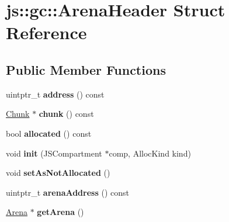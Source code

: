 \hypertarget{structjs_1_1gc_1_1_arena_header}{\section{js\-:\-:gc\-:\-:Arena\-Header Struct Reference}
\label{structjs_1_1gc_1_1_arena_header}
}
\subsection*{Public Member Functions}
\begin{DoxyCompactItemize}
\item 
\hypertarget{structjs_1_1gc_1_1_arena_header_aa2f3ff8445f19ee01d17b03a42a2305a}{uintptr\-\_\-t {\bfseries address} () const }\label{structjs_1_1gc_1_1_arena_header_aa2f3ff8445f19ee01d17b03a42a2305a}

\item 
\hypertarget{structjs_1_1gc_1_1_arena_header_aa18aba696f6fc8a63ea9b75e77dc13fb}{\hyperlink{structjs_1_1gc_1_1_chunk}{Chunk} $\ast$ {\bfseries chunk} () const }\label{structjs_1_1gc_1_1_arena_header_aa18aba696f6fc8a63ea9b75e77dc13fb}

\item 
\hypertarget{structjs_1_1gc_1_1_arena_header_a6a1486aa87c78ebd2fbfcf863c9320c7}{bool {\bfseries allocated} () const }\label{structjs_1_1gc_1_1_arena_header_a6a1486aa87c78ebd2fbfcf863c9320c7}

\item 
\hypertarget{structjs_1_1gc_1_1_arena_header_ab813e5b60976fe7200528ee9ecead2b7}{void {\bfseries init} (J\-S\-Compartment $\ast$comp, Alloc\-Kind kind)}\label{structjs_1_1gc_1_1_arena_header_ab813e5b60976fe7200528ee9ecead2b7}

\item 
\hypertarget{structjs_1_1gc_1_1_arena_header_a250546ae521fdaf268d62486979a45ad}{void {\bfseries set\-As\-Not\-Allocated} ()}\label{structjs_1_1gc_1_1_arena_header_a250546ae521fdaf268d62486979a45ad}

\item 
\hypertarget{structjs_1_1gc_1_1_arena_header_ad9f63b2c56810b826c52bf334bdaa798}{uintptr\-\_\-t {\bfseries arena\-Address} () const }\label{structjs_1_1gc_1_1_arena_header_ad9f63b2c56810b826c52bf334bdaa798}

\item 
\hypertarget{structjs_1_1gc_1_1_arena_header_a7aac8bd26d62641114cde40c536e2650}{\hyperlink{structjs_1_1gc_1_1_arena}{Arena} $\ast$ {\bfseries get\-Arena} ()}\label{structjs_1_1gc_1_1_arena_header_a7aac8bd26d62641114cde40c536e2650}


\end{DoxyCompactItemize}
